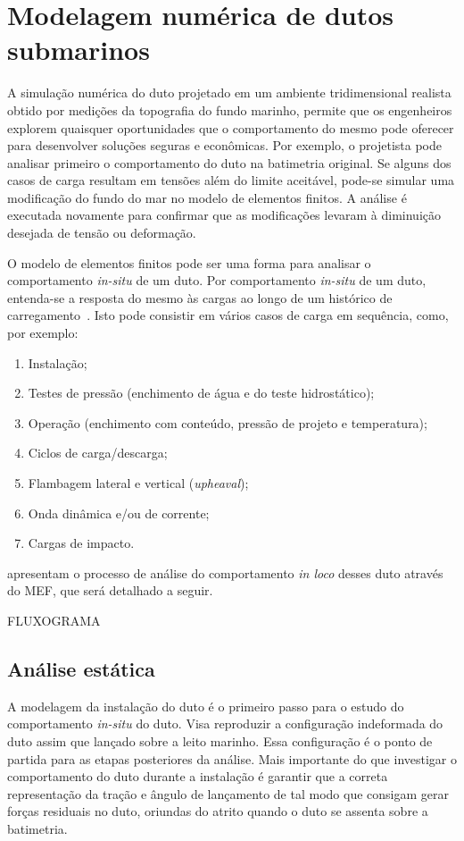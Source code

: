 \section{Modelagem numérica de dutos submarinos}\label{chap:assentamento}


A simulação numérica do duto projetado em um ambiente tridimensional realista obtido por medições da topografia do fundo marinho, permite que os engenheiros explorem quaisquer oportunidades que o comportamento do mesmo pode oferecer para desenvolver soluções seguras e econômicas.
Por exemplo, o projetista pode analisar primeiro o comportamento do duto na batimetria original.
Se alguns dos casos de carga resultam em tensões além do limite aceitável, pode-se simular uma modificação do fundo do mar no modelo de elementos finitos.
A análise é executada novamente para confirmar que as modificações levaram à diminuição desejada de tensão ou deformação.

O modelo de elementos finitos pode ser uma forma para analisar o comportamento \textit{in-situ} de um duto.
Por comportamento \textit{in-situ} de um duto, entenda-se a resposta do mesmo às cargas ao longo de um histórico de carregamento~\cite{Bai2014}. Isto pode consistir em vários casos de carga em sequência, como, por exemplo:

\begin{enumerate}
    \item Instalação;
    \item Testes de pressão (enchimento de água e do teste hidrostático);
    \item Operação (enchimento com conteúdo, pressão de projeto e temperatura);
    \item Ciclos de carga/descarga;
    \item Flambagem lateral e vertical (\textit{upheaval});
    \item Onda dinâmica e/ou de corrente;
    \item Cargas de impacto.
\end{enumerate}

 apresentam o processo de análise do comportamento \textit{in loco} desses duto através do  MEF, que será detalhado a seguir.

FLUXOGRAMA

\subsection{Análise estática}


A modelagem da instalação do duto é o primeiro passo para o estudo do comportamento \textit{in-situ} do duto. Visa reproduzir a configuração indeformada do duto assim que lançado sobre a leito marinho.
Essa configuração é o ponto de partida para as etapas posteriores da análise.
Mais importante do que investigar o comportamento do duto durante a instalação é garantir que a correta representação da tração e ângulo de lançamento de tal modo que consigam gerar forças residuais no duto, oriundas do atrito quando o duto se assenta sobre a batimetria.

